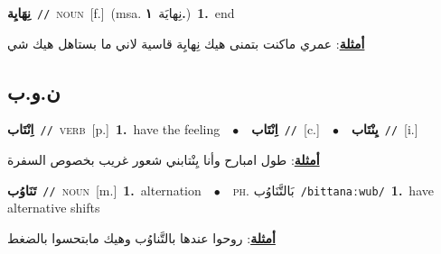 \documentclass[10pt,a4paper,twoside]{article} %
\begin{document}
\begin{multicols}{2}
{\setlength\topsep{0pt}\textbf{\foreignlanguage{arabic}{نِهَايِة}}\ {\color{gray}\texttt{//}\color{black}}\ \textsc{noun}\ [f.]\ \color{gray}(msa. \foreignlanguage{arabic}{نِهايَة}~\foreignlanguage{arabic}{\textbf{١.}})\color{black}\ \textbf{1.}~end\  \begin{flushright}\color{gray}\foreignlanguage{arabic}{\textbf{\underline{\foreignlanguage{arabic}{أمثلة}}}: عمري ماكنت بتمنى هيك نِهايِة قاسية لاني ما بستاهل هيك شي}\end{flushright}\color{black}} \vspace{2mm}

\vspace{-3mm}
\subsection*{\color{blue}\foreignlanguage{arabic}{ن.و.ب}\color{blue}{}} 

{\setlength\topsep{0pt}\textbf{\foreignlanguage{arabic}{اِنْتَاب}}\ {\color{gray}\texttt{//}\color{black}}\ \textsc{verb}\ [p.]\ \textbf{1.}~have the feeling\ \ $\bullet$\ \ \setlength\topsep{0pt}\textbf{\foreignlanguage{arabic}{اِنْتَاب}}\ {\color{gray}\texttt{//}\color{black}}\ [c.]\ \ $\bullet$\ \ \setlength\topsep{0pt}\textbf{\foreignlanguage{arabic}{يِنْتَاب}}\ {\color{gray}\texttt{//}\color{black}}\ [i.]\  \begin{flushright}\color{gray}\foreignlanguage{arabic}{\textbf{\underline{\foreignlanguage{arabic}{أمثلة}}}: طول امبارح وأنا يِنْتابني شعور غريب بخصوص السفرة}\end{flushright}\color{black}} \vspace{2mm}

{\setlength\topsep{0pt}\textbf{\foreignlanguage{arabic}{تَنَاوُب}}\ {\color{gray}\texttt{//}\color{black}}\ \textsc{noun}\ [m.]\ \textbf{1.}~alternation\ \ $\bullet$\ \ \textsc{ph.} \color{gray} \foreignlanguage{arabic}{بَالتَّنَاوُب}\color{black}\ {\color{gray}\texttt{/{\sffamily bittanaːwub}/}\color{black}}\ \textbf{1.}~have alternative shifts\  \begin{flushright}\color{gray}\foreignlanguage{arabic}{\textbf{\underline{\foreignlanguage{arabic}{أمثلة}}}: روحوا عندها بالتَّناوُب وهيك مابتحسوا بالضغط}\end{flushright}\color{black}} \vspace{2mm}


\end{multicols}
\end{document}
